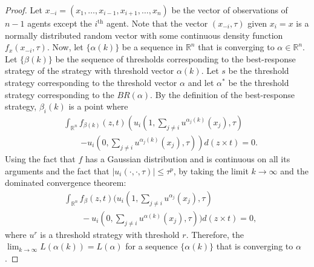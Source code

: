 \documentclass[12pt]{article}
\def\R{\mathbb{R}}    %
\begin{document}
\begin{proof}
Let $x_{-i}=(x_1,\ldots,x_{i-1},x_{i+1},\ldots,x_n)$ be the vector of observations of $n-1$ agents except the $i^{\text{th}}$ agent. Note that the vector $(x_{-i},\tau)$ given $x_i=x$ is a normally distributed random vector with some continuous density function $f_{x}(x_{-i},\tau)$. Now, let $\{\alpha(k)\}$ be a sequence in $\R^n$ that is converging to $\alpha\in\R^n$. Let $\{\beta(k)\}$ be the sequence of thresholds corresponding to the best-response strategy of the strategy with threshold vector $\alpha(k)$. Let $s$ be the threshold strategy corresponding to the threshold vector $\alpha$ and let $\alpha^*$ be the threshold strategy corresponding to the $BR(\alpha)$. By the definition of the best-response strategy, $\beta_i(k)$ is a point where 
\begin{align*}
&\int_{\R^{n}}f_{\beta(k)}(z,t)\left(u_i(1,\sum_{j\not=i}u^{\alpha_j(k)}(x_j),\tau)\right.\\
&\qquad\left.-u_i(0,\sum_{j\not=i}u^{\alpha_j(k)}(x_j),\tau)\right)d(z\times t)=0.
\end{align*}
Using the fact that $f$ has a Gaussian distribution and is continuous on all its arguments and the fact that $|u_i(\cdot,\cdot,\tau)|\leq \tau^p$, by taking the limit $k\to\infty$ and the dominated convergence theorem:
\begin{align*}
&\int_{\R^{n}}f_{\beta}(z,t)(u_i(1,\sum_{j\not=i}u^{\alpha_j}(x_j),\tau)\\ 
&\qquad-u_i(0,\sum_{j\not=i}u^{\alpha(k)}(x_j),\tau))d(z\times t)=0,
\end{align*}
where $u^{r}$ is a threshold strategy with threshold $r$. Therefore, the $\lim_{k\to\infty}L(\alpha(k))=L(\alpha)$ for a sequence $\{\alpha(k)\}$ that is converging to $\alpha$.
\end{proof}
\end{document}
